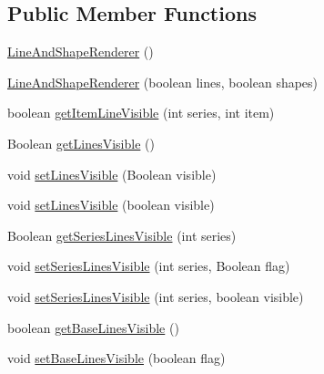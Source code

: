 \subsection*{Public Member Functions}
\begin{DoxyCompactItemize}
\item 
\mbox{\hyperlink{classorg_1_1jfree_1_1chart_1_1renderer_1_1category_1_1_line_and_shape_renderer_a1be2b09227213fef5a63b2357205d631}{Line\+And\+Shape\+Renderer}} ()
\item 
\mbox{\hyperlink{classorg_1_1jfree_1_1chart_1_1renderer_1_1category_1_1_line_and_shape_renderer_a93dc7c9629de38c15177de9f90b7d3d2}{Line\+And\+Shape\+Renderer}} (boolean lines, boolean shapes)
\item 
boolean \mbox{\hyperlink{classorg_1_1jfree_1_1chart_1_1renderer_1_1category_1_1_line_and_shape_renderer_a5ecab94faf713e21647869f35b5e0a16}{get\+Item\+Line\+Visible}} (int series, int item)
\item 
Boolean \mbox{\hyperlink{classorg_1_1jfree_1_1chart_1_1renderer_1_1category_1_1_line_and_shape_renderer_aae2830cd3d5576be04342cb538b08c4c}{get\+Lines\+Visible}} ()
\item 
void \mbox{\hyperlink{classorg_1_1jfree_1_1chart_1_1renderer_1_1category_1_1_line_and_shape_renderer_ac17bb2a4b2553880625859d5f09c88e4}{set\+Lines\+Visible}} (Boolean visible)
\item 
void \mbox{\hyperlink{classorg_1_1jfree_1_1chart_1_1renderer_1_1category_1_1_line_and_shape_renderer_a394a9bf0733275d47990797ff00835c3}{set\+Lines\+Visible}} (boolean visible)
\item 
Boolean \mbox{\hyperlink{classorg_1_1jfree_1_1chart_1_1renderer_1_1category_1_1_line_and_shape_renderer_a644c14daf7af65eb496c489825f639d3}{get\+Series\+Lines\+Visible}} (int series)
\item 
void \mbox{\hyperlink{classorg_1_1jfree_1_1chart_1_1renderer_1_1category_1_1_line_and_shape_renderer_a7f0605e3100eca00637cb838a78244fe}{set\+Series\+Lines\+Visible}} (int series, Boolean flag)
\item 
void \mbox{\hyperlink{classorg_1_1jfree_1_1chart_1_1renderer_1_1category_1_1_line_and_shape_renderer_a6169c2b206e917b1267318bda2e061d7}{set\+Series\+Lines\+Visible}} (int series, boolean visible)
\item 
boolean \mbox{\hyperlink{classorg_1_1jfree_1_1chart_1_1renderer_1_1category_1_1_line_and_shape_renderer_adf128582d832a53fc80c264d84d13999}{get\+Base\+Lines\+Visible}} ()
\item 
void \mbox{\hyperlink{classorg_1_1jfree_1_1chart_1_1renderer_1_1category_1_1_line_and_shape_renderer_a68fe54a5e7586d03eb4df8a6048c8ed1}{set\+Base\+Lines\+Visible}} (boolean flag)

\end{DoxyCompactItemize}
